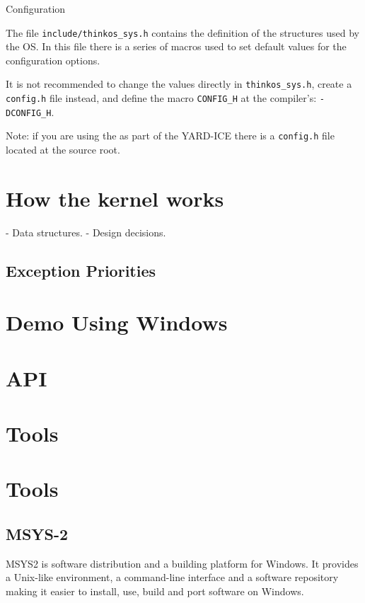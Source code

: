 Configuration

The file \lstinline{include/thinkos_sys.h} contains the definition of the structures used by the OS. In this file there is a series of macros used to set default values for the configuration options.

It is not recommended to change the values directly in \lstinline{thinkos_sys.h}, create a \lstinline{config.h} file instead, and define the macro \lstinline{CONFIG_H} at the compiler's: \lstinline{-DCONFIG_H}.

Note: if you are using the \ThinkOS as part of the YARD-ICE there is a \lstinline{config.h} file located at the source root.

\section{How the kernel works}
 - Data structures.
 - Design decisions.

\subsection{Exception Priorities}

\section {Demo Using Windows}

%


\section {API}




\section {Tools}
\section{Tools}

\subsection{MSYS-2}

MSYS2 is software distribution and a building platform for Windows. It provides a Unix-like environment, a command-line interface and a software repository making it easier to install, use, build and port software on Windows.\\

